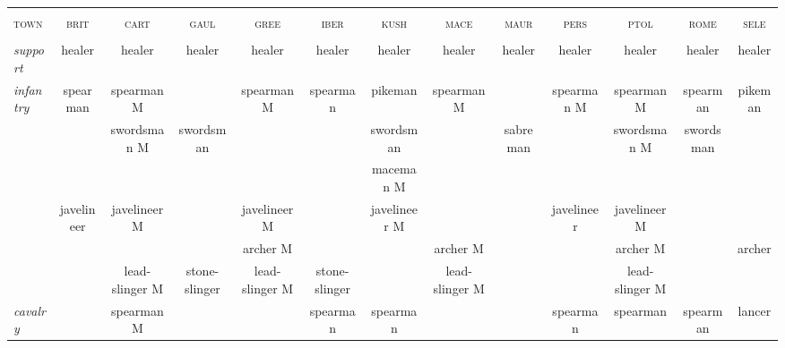 \documentclass{article}
\newcommand{\brit}{\textsc{\color{blue} brit}}
\newcommand{\cart}{\textsc{\color{blue} cart}}
\newcommand{\gaul}{\textsc{\color{blue} gaul}}
\newcommand{\gree}{\textsc{\color{blue} gree}}
\newcommand{\iber}{\textsc{\color{blue} iber}}
\newcommand{\kush}{\textsc{\color{blue} kush}}
\newcommand{\mace}{\textsc{\color{blue} mace}}
\newcommand{\maur}{\textsc{\color{blue} maur}}
\newcommand{\pers}{\textsc{\color{blue} pers}}
\newcommand{\ptol}{\textsc{\color{blue} ptol}}
\newcommand{\rome}{\textsc{\color{blue} rome}}
\newcommand{\sele}{\textsc{\color{blue} sele}}
\newcommand{\town}{\textsc{\color{blue} town}}
\begin{document}
\begin{landscape}
\begin{tabular}{l||c|c|c|c||c|c|c|c||c|c|c|c}
\hline
\hline
 &                &                &                &                &                &                &                &                &                &                &                &                \\
\town %
 & \brit          & \cart          & \gaul          & \gree          & \iber          & \kush          & \mace          & \maur          & \pers          & \ptol          & \rome          & \sele          \\
 &                &                &                &                &                &                &                &                &                &                &                &                \\
\hline
\hline\textit{support}
 & healer         & healer         & healer         & healer         & healer         & healer         & healer         & healer         & healer         & healer         & healer         & healer         \\
\hline\textit{infantry}
 & spearman       & spearman M     &                & spearman M     & spearman       & pikeman        & spearman M     &                & spearman M     & spearman M     & spearman       & pikeman        \\
 &                & swordsman M    & swordsman      &                &                & swordsman      &                & sabreman       &                & swordsman M    & swordsman      &                \\
 &                &                &                &                &                & maceman M      &                &                &                &                &                &                \\
 & javelineer     & javelineer M   &                & javelineer M   &                & javelineer M   &                &                & javelineer     & javelineer M   &                &                \\
 &                &                &                & archer M       &                &                & archer M       &                &                & archer M       &                & archer         \\
 &                & lead-slinger M & stone-slinger  & lead-slinger M & stone-slinger  &                & lead-slinger M &                &                & lead-slinger M &                &                \\
\hline\textit{cavalry}
 &                & spearman M     &                &                & spearman       & spearman       &                &                & spearman       & spearman       & spearman       & lancer         \\

\end{tabular}
\end{landscape}
\end{document}
